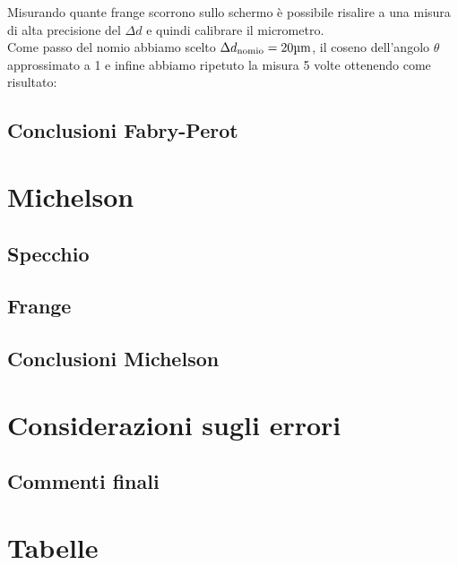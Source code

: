 \documentclass[letterpaper,12pt]{article}
\begin{document}
Misurando quante frange scorrono sullo schermo è possibile risalire a una misura di alta precisione
del $\Delta d$ e quindi calibrare il micrometro.\\
Come passo del nomio abbiamo scelto $\Delta d_\text{nomio} = 20\text{\SIUnitSymbolMicro m}$, il coseno dell'angolo $\theta$ approssimato a 1
e infine abbiamo ripetuto la misura 5 volte ottenendo come risultato:




\subsection{Conclusioni Fabry-Perot}



\section{Michelson}

\subsection{Specchio}


\subsection{Frange}


\subsection{Conclusioni Michelson}




\section{Considerazioni sugli errori}
\label{sec:errori}

\subsection{Commenti finali}



\newpage
\section{Tabelle}
\end{document}
